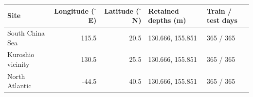 \begin{tabular}{lrrll}
\toprule
Site & Longitude ($^\circ$E) & Latitude ($^\circ$N) & Retained depths (m) & Train / test days \\
\midrule
South China Sea & 115.5 & 20.5 & 130.666, 155.851 & 365 / 365 \\
Kuroshio vicinity & 130.5 & 25.5 & 130.666, 155.851 & 365 / 365 \\
North Atlantic & -44.5 & 40.5 & 130.666, 155.851 & 365 / 365 \\
\bottomrule
\end{tabular}

